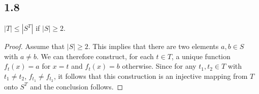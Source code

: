 \subsection*{1.8} $|T| \leq |S^T|$ if $|S| \geq 2$.

\begin{proof}
Assume that $|S| \geq 2$. This implies that there are two elements $a,b \in S$ with $a \neq b$. We can therefore construct, for each $t \in T$, a unique function $f_t(x) = a$ for $x = t$ and $f_t(x) = b$ otherwise. Since for any $t_1, t_2 \in T$ with $t_1 \neq t_2$, $f_{t_1} \neq f_{t_2}$, it follows that this construction is an injective mapping from $T$ onto $S^T$ and the conclusion follows.

\end{proof}

